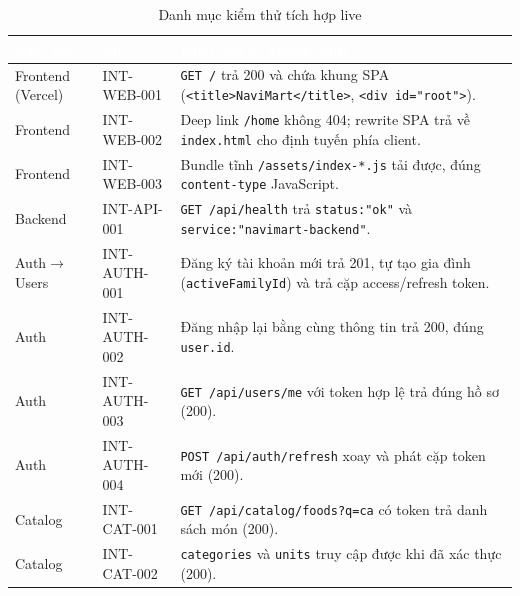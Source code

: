 \documentclass[12pt,a4paper]{article}
\renewcommand{\arraystretch}{1.35}
\newcommand{\code}[1]{\texttt{#1}}
\newcommand{\thead}[1]{\textbf{\textcolor{white}{#1}}}
\begin{document}
\begin{table}[p]
\centering
\caption{Danh mục kiểm thử tích hợp live}
\label{tab:intlive}

\fontsize{11.5}{10.7}\selectfont
\setlength{\tabcolsep}{3pt}
\renewcommand{\arraystretch}{0.92}

\begin{tabularx}{\linewidth}{
|>{\raggedright\arraybackslash}p{2.0cm}
|>{\raggedright\arraybackslash}p{2.35cm}
|Y|
}
\hline
{}
\thead{Khu vực}
&
\thead{Mã}
&
\thead{Kịch bản \& khẳng định}
\\
\hline

Frontend (Vercel)
&
INT-WEB-001
&
\code{GET /} trả 200 và chứa khung SPA
(\code{<title>NaviMart</title>}, \code{<div id="root">}).
\\
\hline

Frontend
&
INT-WEB-002
&
Deep link \code{/home} không 404; rewrite SPA trả về
\code{index.html} cho định tuyến phía client.
\\
\hline

Frontend
&
INT-WEB-003
&
Bundle tĩnh \code{/assets/index-*.js} tải được, đúng
\code{content-type} JavaScript.
\\
\hline

Backend
&
INT-API-001
&
\code{GET /api/health} trả \code{status:"ok"} và
\code{service:"navimart-backend"}.
\\
\hline

Auth$\to$Users
&
INT-AUTH-001
&
Đăng ký tài khoản mới trả 201, tự tạo gia đình
(\code{activeFamilyId}) và trả cặp access/refresh token.
\\
\hline

Auth
&
INT-AUTH-002
&
Đăng nhập lại bằng cùng thông tin trả 200, đúng \code{user.id}.
\\
\hline

Auth
&
INT-AUTH-003
&
\code{GET /api/users/me} với token hợp lệ trả đúng hồ sơ (200).
\\
\hline

Auth
&
INT-AUTH-004
&
\code{POST /api/auth/refresh} xoay và phát cặp token mới (200).
\\
\hline

Catalog
&
INT-CAT-001
&
\code{GET /api/catalog/foods?q=ca} có token trả danh sách món (200).
\\
\hline

Catalog
&
INT-CAT-002
&
\code{categories} và \code{units} truy cập được khi đã xác thực (200).
\\
\hline


\end{tabularx}
\end{table}
\end{document}

